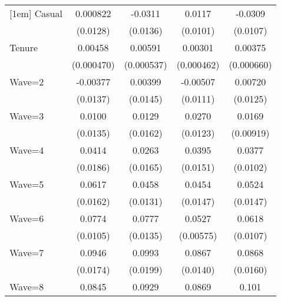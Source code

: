 {\begin{tabular}{l*{4}{c}}
[1em]
Casual              &    0.000822         &     -0.0311\sym{*}  &      0.0117         &     -0.0309\sym{**} \\
                    &    (0.0128)         &    (0.0136)         &    (0.0101)         &    (0.0107)         \\
[1em]
Tenure              &     0.00458\sym{***}&     0.00591\sym{***}&     0.00301\sym{***}&     0.00375\sym{***}\\
                    &  (0.000470)         &  (0.000537)         &  (0.000462)         &  (0.000660)         \\
[1em]
Wave=2              &    -0.00377         &     0.00399         &    -0.00507         &     0.00720         \\
                    &    (0.0137)         &    (0.0145)         &    (0.0111)         &    (0.0125)         \\
[1em]
Wave=3              &      0.0100         &      0.0129         &      0.0270\sym{*}  &      0.0169         \\
                    &    (0.0135)         &    (0.0162)         &    (0.0123)         &   (0.00919)         \\
[1em]
Wave=4              &      0.0414\sym{*}  &      0.0263         &      0.0395\sym{**} &      0.0377\sym{***}\\
                    &    (0.0186)         &    (0.0165)         &    (0.0151)         &    (0.0102)         \\
[1em]
Wave=5              &      0.0617\sym{***}&      0.0458\sym{***}&      0.0454\sym{**} &      0.0524\sym{***}\\
                    &    (0.0162)         &    (0.0131)         &    (0.0147)         &    (0.0147)         \\
[1em]
Wave=6              &      0.0774\sym{***}&      0.0777\sym{***}&      0.0527\sym{***}&      0.0618\sym{***}\\
                    &    (0.0105)         &    (0.0135)         &   (0.00575)         &    (0.0107)         \\
[1em]
Wave=7              &      0.0946\sym{***}&      0.0993\sym{***}&      0.0867\sym{***}&      0.0868\sym{***}\\
                    &    (0.0174)         &    (0.0199)         &    (0.0140)         &    (0.0160)         \\
[1em]
Wave=8              &      0.0845\sym{***}&      0.0929\sym{***}&      0.0869\sym{***}&       0.101\sym{***}\\

\end{tabular}}

